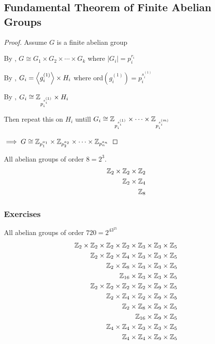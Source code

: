 \newpage
\subsection*{Fundamental Theorem of Finite Abelian Groups}
{\large{}}
\begin{proof}
    Assume $G$ is a finite abelian group

    By , 
    $G \cong G_1 \times G_2 \times \cdots \times G_k$
    where $|G_i|=p_i^{r_i}$

    By , $G_i=\left\langle g_i^{(1)} \right\rangle\times H_i$
    where ord$(g_i^{(1)})=p_i^{s_i^{(1)}}$

    By , $G_i \cong \mathbb{Z}_{p_i^{s_i^{(1)}}} \times H_i$

    Then repeat this on $H_i$ untill $G_i \cong \mathbb{Z}_{p_i^{s_i^{(1)}}}\times \cdots \times \mathbb{Z}_{p_i^{s_i^{(m)}}}$

    $\implies G \cong \mathbb{Z}_{p_1^{a_1}}\times \mathbb{Z}_{p_2^{a_2}}\times\cdots\times\mathbb{Z}_{p_n^{a_n}}$
\end{proof}

\begin{example}
    All abelian groups of order $8=2^3$.
    \begin{align*}
        \mathbb{Z}_2\times\mathbb{Z}_2\times\mathbb{Z}_2\\
        \mathbb{Z}_2\times\mathbb{Z}_4\\
        \mathbb{Z}_8
    \end{align*}
\end{example}

\newpage
\subsubsection{Exercises}
\begin{example}
    All abelian groups of order $720=2^43^25$
    \begin{align*}
        \mathbb{Z}_2\times\mathbb{Z}_2\times\mathbb{Z}_2\times\mathbb{Z}_2\times\mathbb{Z}_3\times\mathbb{Z}_3\times\mathbb{Z}_5\\
        \mathbb{Z}_2\times\mathbb{Z}_2\times\mathbb{Z}_4\times\mathbb{Z}_3\times\mathbb{Z}_3\times\mathbb{Z}_5\\
        \mathbb{Z}_2\times\mathbb{Z}_8\times\mathbb{Z}_3\times\mathbb{Z}_3\times\mathbb{Z}_5\\
        \mathbb{Z}_{16}\times\mathbb{Z}_3\times\mathbb{Z}_3\times\mathbb{Z}_5\\
        \mathbb{Z}_2\times\mathbb{Z}_2\times\mathbb{Z}_2\times\mathbb{Z}_2\times\mathbb{Z}_9\times\mathbb{Z}_5\\
        \mathbb{Z}_2\times\mathbb{Z}_4\times\mathbb{Z}_2\times\mathbb{Z}_9\times\mathbb{Z}_5\\
        \mathbb{Z}_2\times\mathbb{Z}_8\times\mathbb{Z}_9\times\mathbb{Z}_5\\
        \mathbb{Z}_{16}\times\mathbb{Z}_9\times\mathbb{Z}_5\\
        \mathbb{Z}_4\times\mathbb{Z}_4\times\mathbb{Z}_3\times\mathbb{Z}_3\times\mathbb{Z}_5\\
        \mathbb{Z}_4\times\mathbb{Z}_4\times\mathbb{Z}_9\times\mathbb{Z}_5\\
    \end{align*}
\end{example}

